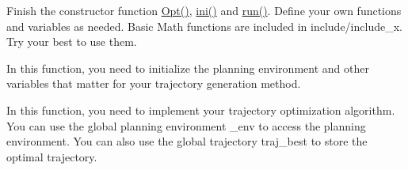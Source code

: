
\begin{DoxyRefList}
\item[Class \mbox{\hyperlink{classOpt}{Opt}} ]\label{todo__todo000002}%
%
Finish the constructor function \mbox{\hyperlink{classOpt_ae1ec631e0d039be80e5182b5d79ec0dd}{Opt()}}, \mbox{\hyperlink{classOpt_ab97fce886ace5d52e172b57e787d2118}{ini()}} and \mbox{\hyperlink{classOpt_ac81edf86e4a30e87db326f07ea971c6e}{run()}}. Define your own functions and variables as needed. Basic Math functions are included in {\ttfamily include/include\+\_\+x}. Try your best to use them.  
\item[Member \mbox{\hyperlink{classOpt_ab97fce886ace5d52e172b57e787d2118}{Opt::ini}} (\mbox{\hyperlink{structPlanningEnv__S}{Planning\+Env\+\_\+S}} $\ast$\+\_\+env)]\label{todo__todo000003}%
%
In this function, you need to initialize the planning environment and other variables that matter for your trajectory generation method.  
\item[Member \mbox{\hyperlink{classOpt_ac81edf86e4a30e87db326f07ea971c6e}{Opt::run}} ()]\label{todo__todo000004}%
%
In this function, you need to implement your trajectory optimization algorithm. You can use the global planning environment {\ttfamily \+\_\+env} to access the planning environment. You can also use the global trajectory {\ttfamily traj\+\_\+best} to store the optimal trajectory. 
\end{DoxyRefList}